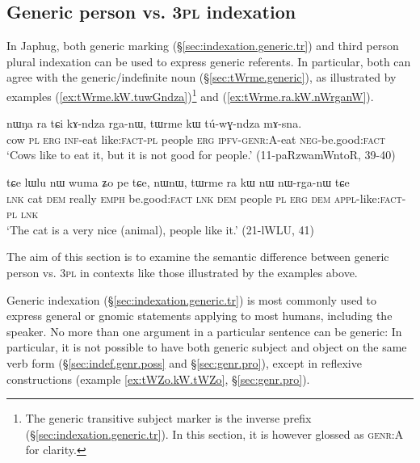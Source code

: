 \subsection{Generic person vs. \textsc{3pl} indexation} \label{sec:genr.3pl}
In Japhug, both generic marking (§\ref{sec:indexation.generic.tr}) and third person plural indexation can be used to express generic referents. In particular, both can agree with the generic/indefinite noun  (§\ref{sec:tWrme.generic}), as illustrated by examples (\ref{ex:tWrme.kW.tuwGndza})\footnote{The generic transitive subject marker is the inverse prefix (§\ref{sec:indexation.generic.tr}). In this section, it is however glossed as \textsc{genr}:A for clarity. } and (\ref{ex:tWrme.ra.kW.nWrganW}).


\begin{exe}
\ex   \label{ex:tWrme.kW.tuwGndza}
 \gll nɯŋa ra tɕi kɤ-ndza rga-nɯ, tɯrme kɯ tú-wɣ-ndza mɤ-sna. \\
cow \textsc{pl} \textsc{erg} \textsc{inf}-eat like:\textsc{fact}-\textsc{pl} people \textsc{erg} \textsc{ipfv}-\textsc{genr}:\textsc{A}-eat \textsc{neg}-be.good:\textsc{fact} \\
\glt `Cows like to eat it, but it is not good for people.' (11-paRzwamWntoR, 39-40)
\end{exe}

\begin{exe}
\ex   \label{ex:tWrme.ra.kW.nWrganW}
 \gll  tɕe lɯlu nɯ wuma ʑo pe tɕe, nɯnɯ, tɯrme ra kɯ nɯ nɯ-rga-nɯ tɕe \\
\textsc{lnk} cat \textsc{dem} really \textsc{emph} be.good:\textsc{fact} \textsc{lnk} \textsc{dem} people \textsc{pl} \textsc{erg} \textsc{dem} \textsc{appl}-like:\textsc{fact}-\textsc{pl} \textsc{lnk} \\
\glt `The cat is a very nice (animal), people like it.' (21-lWLU, 41)
\end{exe}

The aim of this section is to examine the semantic difference between generic person vs. \textsc{3pl} in contexts like those illustrated by the examples above.

Generic indexation (§\ref{sec:indexation.generic.tr}) is most commonly used to express general or gnomic statements applying to most humans, including the speaker. No more than one argument in a particular sentence can be generic: In particular, it is not possible to have both generic subject and object on the same verb form (§\ref{sec:indef.genr.poss} and §\ref{sec:genr.pro}), except in reflexive constructions (example \ref{ex:tWZo.kW.tWZo}, §\ref{sec:genr.pro}). 

